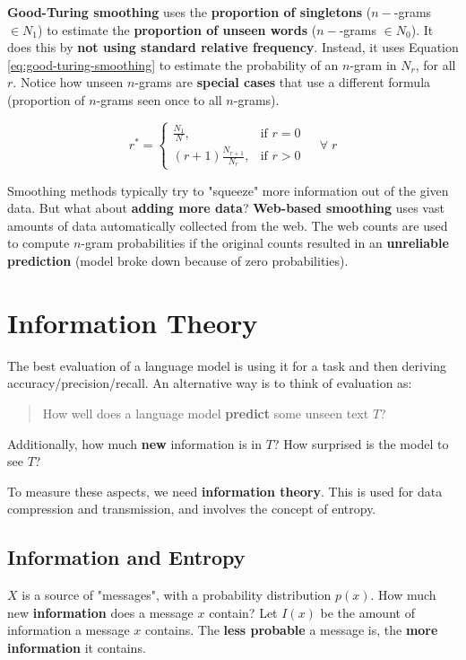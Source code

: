 \documentclass{article}
\begin{document}
\textbf{Good-Turing smoothing} uses the \textbf{proportion of singletons} ($n-$-grams $\in N_1$) to estimate the \textbf{proportion of unseen words} ($n-$-grams $\in N_0$). It does this by \textbf{not using standard relative frequency}. Instead, it uses Equation \ref{eq:good-turing-smoothing} to estimate the probability of an $n$-gram in $N_r$, for all $r$. Notice how unseen $n$-grams are \textbf{special cases} that use a different formula (proportion of $n$-grams seen once to all $n$-grams).

\begin{equation}
	r^{\ast} = \begin{cases}
		\frac{N_1}{N},& \text{if }r=0 \\
		(r + 1)\frac{N_{r+1}}{N_r} ,& \text{if }r>0
	\end{cases} \;\;\;\; \forall \; r
	\label{eq:good-turing-smoothing}
\end{equation}

Smoothing methods typically try to "squeeze" more information out of the given data. But what about  \textbf{adding more data}? \textbf{Web-based smoothing} uses vast amounts of data automatically collected from the web. The web counts are used to compute $n$-gram probabilities if the original counts resulted in an \textbf{unreliable prediction} (model broke down because of zero probabilities).

\section{Information Theory}

The best evaluation of a language model is using it for a task and then deriving accuracy/precision/recall. An alternative way is to think of evaluation as:
\begin{quote}
	How well does a language model \textbf{predict} some unseen text $T$?
\end{quote}
Additionally, how much \textbf{new} information is in $T$? How surprised is the model to see $T$?

To measure these aspects, we need \textbf{information theory}. This is used for data compression and transmission, and involves the concept of entropy.

\subsection{Information and Entropy}

$X$ is a source of "messages", with a probability distribution $p(x)$. How much new \textbf{information} does a message $x$ contain? Let $I(x)$ be the amount of information a message $x$ contains. The \textbf{less probable} a message is, the \textbf{more information} it contains.
\end{document}
